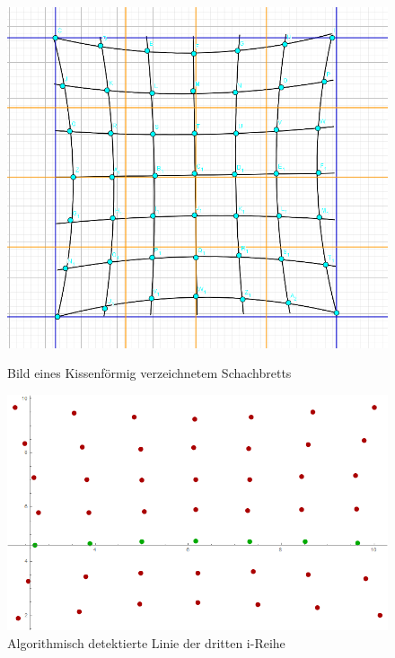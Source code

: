 \begin{figure}[!htb]
	\includegraphics[width=\linewidth]{images/KissenVerzeichnung.png}
	\caption{Bild eines Kissenförmig verzeichnetem Schachbretts}
	\label{fig:awesome_image1}
	\endminipage\hfill
	\includegraphics[width=\linewidth]{images/AlgKissen.png}
	\caption{Algorithmisch detektierte Linie der dritten i-Reihe}
	\label{fig:awesome_image2}
	\endminipage\hfill
\end{figure}


